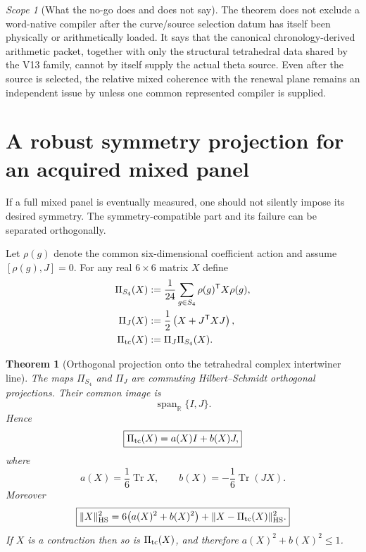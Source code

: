 \documentclass[11pt]{article}
\newtheorem{theorem}{Theorem}[section]
\theoremstyle{definition}
\theoremstyle{remark}
\newtheorem{scope}[scope]{Scope}
\newcommand{\R}{\mathbb R}
\newcommand{\Tr}{\operatorname{Tr}}
\newcommand{\HS}{\mathrm{HS}}
\begin{document}
\begin{scope}[What the no-go does and does not say]
The theorem does not exclude a word-native compiler after the curve/source
selection datum has itself been physically or arithmetically loaded.  It says
that the canonical chronology-derived arithmetic packet, together with only
the structural tetrahedral data shared by the V13 family, cannot by itself
supply the actual theta source.  Even after the source is selected, the
relative mixed coherence with the renewal plane remains an independent issue
by  unless one common represented
compiler is supplied.
\end{scope}

\section{A robust symmetry projection for an acquired mixed panel}
\label{sec:v15-projection}

If a full mixed panel is eventually measured, one should not silently impose
its desired symmetry.  The symmetry-compatible part and its failure can be
separated orthogonally.

Let $\rho(g)$ denote the common six-dimensional coefficient action and assume
$[\rho(g),J]=0$.  For any real $6\times6$ matrix $X$ define
\begin{align}
 \Pi_{S_4}(X)
 &:=\frac1{24}\sum_{g\in S_4}\rho(g)^{\mathsf T}X\rho(g),
 \label{eq:v15-PiG}\\
 \Pi_J(X)
 &:=\frac12\left(X+J^{\mathsf T}XJ\right),
 \label{eq:v15-PiJ}\\
 \Pi_{\rm tc}(X)&:=\Pi_J\Pi_{S_4}(X).
 \label{eq:v15-Pitc}
\end{align}

\begin{theorem}[Orthogonal projection onto the tetrahedral complex intertwiner line]
\label{thm:v15-symmetry-projection}
The maps $\Pi_{S_4}$ and $\Pi_J$ are commuting Hilbert--Schmidt orthogonal
projections.  Their common image is
\[
 \boxed{\operatorname{span}_{\R}\{I,J\}.}
\]
Hence
\begin{equation}
 \boxed{
 \Pi_{\rm tc}(X)=a(X)I+b(X)J,}
 \label{eq:v15-projected-X}
\end{equation}
where
\begin{equation}
 \boxed{
 a(X)=\frac16\Tr X,
 \qquad
 b(X)=-\frac16\Tr(JX).}
 \label{eq:v15-ab-projection}
\end{equation}
Moreover
\begin{equation}
 \boxed{
 \|X\|_{\HS}^2
 =6\bigl(a(X)^2+b(X)^2\bigr)
 +\|X-\Pi_{\rm tc}(X)\|_{\HS}^2.}
 \label{eq:v15-pythagoras}
\end{equation}
If $X$ is a contraction then so is $\Pi_{\rm tc}(X)$, and therefore
$a(X)^2+b(X)^2\le1$.
\end{theorem}
\end{document}
